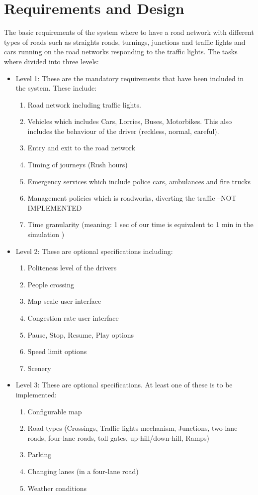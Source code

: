 \documentclass{article}[11pt,Tahoma]
\begin{document}
	\section{Requirements and Design}
		\noindent The basic requirements of the system where to have a road network with different types of roads such as straights roads, turnings, junctions and traffic lights and cars running on the road networks responding to the traffic lights.
			 The tasks where divided into three levels:
		\begin{itemize}[noitemsep]
			 \item Level 1: These are the mandatory requirements that have been included in the system. These include:
			 	\begin{enumerate}[noitemsep]
			 		\item Road network including traffic lights.
			 		\item Vehicles which includes Cars, Lorries, Buses, Motorbikes. This also includes the behaviour of the driver (reckless, normal, careful).
			 		\item Entry and exit to the road network
			 		\item Timing of journeys (Rush hours)
			 		\item Emergency services which include police cars, ambulances and fire trucks
			 		\item Management policies which is roadworks, diverting the traffic --NOT IMPLEMENTED
			 		\item Time granularity (meaning: 1 sec of our time is equivalent to 1 min in the simulation )
			 	\end{enumerate}
			 \item Level 2: These are optional specifications including:
			 	\begin{enumerate}[noitemsep]
			 		\item Politeness level of the drivers
			 		\item People crossing
			 		\item Map scale user interface 
			 		\item Congestion rate user interface
			 		\item Pause, Stop, Resume, Play options
			 		\item Speed limit options
			 		\item Scenery
				 \end{enumerate}
			 \item Level 3: These are optional specifications. At least one of these is to be implemented:
				 \begin{enumerate}[noitemsep]
				 	\item Configurable map
				 	\item Road types (Crossings, Traffic lights mechanism, Junctions, two-lane roads, four-lane roads, toll gates, up-hill/down-hill, Ramps)
				 	\item Parking
			 		\item Changing lanes (in a four-lane road)
				 	\item Weather conditions
			 \end{enumerate}			 		 
		 \end{itemize}
			 
\end{document}

